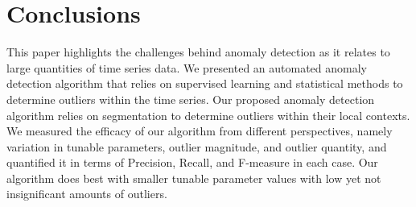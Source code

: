 \documentclass[conference]{IEEEtran}
\begin{document}
\section{Conclusions}
\label{conclusion}
This paper highlights the challenges behind anomaly detection as it relates to large quantities of time series data. We presented an automated anomaly detection algorithm that relies on supervised learning and statistical methods to determine outliers within the time series. Our proposed anomaly detection algorithm relies on segmentation to determine outliers within their local contexts. We measured the efficacy of our algorithm from different perspectives, namely variation in tunable parameters, outlier magnitude, and outlier quantity, and quantified it in terms of Precision, Recall, and F-measure in each case. Our algorithm does best with smaller tunable parameter values with low yet not insignificant amounts of outliers.




%
%
{
	
	
}
%
\end{document}
